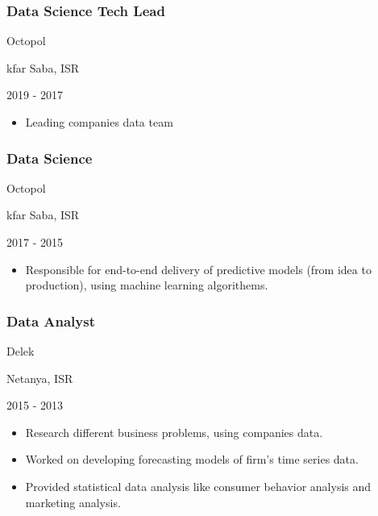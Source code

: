 \documentclass[]{article}
\providecommand{\tightlist}{%
  \setlength{\itemsep}{0pt}\setlength{\parskip}{0pt}}
\begin{document}
\hypertarget{data-science-tech-lead}{%
\subsubsection{Data Science Tech Lead}\label{data-science-tech-lead}}

Octopol

kfar Saba, ISR

2019 - 2017

\begin{itemize}
\tightlist
\item
  Leading companies data team
\end{itemize}

\hypertarget{data-science}{%
\subsubsection{Data Science}\label{data-science}}

Octopol

kfar Saba, ISR

2017 - 2015

\begin{itemize}
\tightlist
\item
  Responsible for end-to-end delivery of predictive models (from idea to
  production), using machine learning algorithems.
\end{itemize}

\hypertarget{data-analyst}{%
\subsubsection{Data Analyst}\label{data-analyst}}

Delek

Netanya, ISR

2015 - 2013

\begin{itemize}
\tightlist
\item
  Research different business problems, using companies data.
\item
  Worked on developing forecasting models of firm's time series data.
\item
  Provided statistical data analysis like consumer behavior analysis and
  marketing analysis.
\end{itemize}
\end{document}
